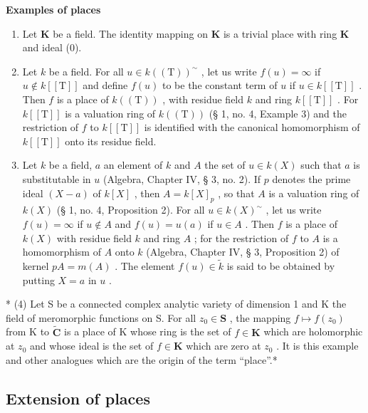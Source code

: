 \textbf{Examples of places}\par

\begin{enumerate}
\def\labelenumi{(\arabic{enumi})}
\item
  Let \(\mathbf{K}\) be a field. The identity mapping on \(\mathbf{K}\) is a trivial place with ring \(\mathbf{K}\) and ideal (0).
\item
  Let \(k\) be a field. For all \(u \in k((\mathrm{T}))^{\sim}\) , let us write \(f(u) = \infty\) if \(u \notin k[[\mathrm{T}]]\) and define \(f(u)\) to be the constant term of \(u\) if \(u \in k[[\mathrm{T}]]\) . Then \(f\) is a place of \(k((\mathrm{T}))\) , with residue field \(k\) and ring \(k[[\mathrm{T}]]\) . For \(k[[\mathrm{T}]]\) is a valuation ring of \(k((\mathrm{T}))\) (§ 1, no. 4, Example 3) and the restriction of \(f\) to \(k[[\mathrm{T}]]\) is identified with the canonical homomorphism of \(k[[\mathrm{T}]]\) onto its residue field.
\item
  Let \(k\) be a field, \(a\) an element of \(k\) and \(A\) the set of \(u \in k(X)\) such that \(a\) is substitutable in \(u\) (Algebra, Chapter IV, § 3, no. 2). If \(p\) denotes the prime ideal \((X - a)\) of \(k[X]\) , then \(A = k[X]_p\) , so that \(A\) is a valuation ring of \(k(X)\) (§ 1, no. 4, Proposition 2). For all \(u \in k(X)^{\sim}\) , let us write \(f(u) = \infty\) if \(u \notin A\) and \(f(u) = u(a)\) if \(u \in A\) . Then \(f\) is a place of \(k(X)\) with residue field \(k\) and ring \(A\) ; for the restriction of \(f\) to \(A\) is a homomorphism of \(A\) onto \(k\) (Algebra, Chapter IV, § 3, Proposition 2) of kernel \(pA = m(A)\) . The element \(f(u) \in \tilde{k}\) is said to be obtained by putting \(X = a\) in \(u\) .
\end{enumerate}

* (4) Let S be a connected complex analytic variety of dimension 1 and K the field of meromorphic functions on S. For all \(z_0 \in \mathbf{S}\) , the mapping \(f \mapsto f(z_0)\) from K to \(\tilde{\mathbf{C}}\) is a place of K whose ring is the set of \(f \in \mathbf{K}\) which are holomorphic at \(z_0\) and whose ideal is the set of \(f \in \mathbf{K}\) which are zero at \(z_0\) . It is this example and other analogues which are the origin of the term ``place''.*

\subsection{Extension of places}

